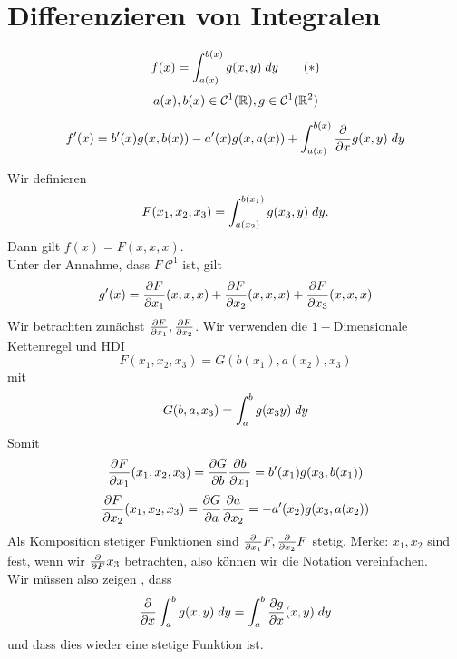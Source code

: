 \documentclass[../ana2u.tex]{subfiles}
\begin{document}
\setcounter{section}{11}
\section{Differenzieren von Integralen}
\[ f(x) = \integralx{g(x,y)}{a(x)}{b(x)}{y} \tag{\(*\)} \]
\[ a(x), b(x) \in \mathcal{C}^1(\R), 
g \in \mathcal{C}^1(\R^2) \]

\begin{beh}
    \[ f'(x) = b'(x)g(x, b(x)) - a'(x)g(x,a(x))
    + \integralx{\ddxpartial{x} g(x,y)}{a(x)}{b(x)}{y} \]
\end{beh}
\begin{bew}
    Wir definieren 
    \[ F(x_1, x_2, x_3) 
    = \integralx{g(x_3, y)}{a(x_2)}{b(x_1)}{y}. \]
    Dann gilt \( f(x) = F(x,x,x) \).\\
    Unter der Annahme, dass \( F \ \mathcal{C}^1 \) ist, 
    gilt
    \[ g'(x) = \ddxpartialboth{F}{x_1}(x,x,x) 
    + \ddxpartialboth{F}{x_2}(x,x,x) 
    + \ddxpartialboth{F}{x_3}(x,x,x) \]
    Wir betrachten zunächst \(\ddxpartialboth{F}{x_1}, 
    \ddxpartialboth{F}{x_2}\).
    Wir verwenden die \(1-\)Dimensionale Kettenregel und HDI
    \[ F(x_1, x_2, x_3) = G(b(x_1), a(x_2),x_3) \]
    mit 
    \[ G(b,a,x_3) = \integralx{g(x_3y)}{a}{b}{y} \]
    Somit
    \[ \ddxpartialboth{F}{x_1}(x_1,x_2,x_3) 
    = \ddxpartialboth{G}{b} \ddxpartialboth{b}{x_1} = b'(x_1)g(x_3, b(x_1)) \]
    \[ \ddxpartialboth{F}{x_2}(x_1,x_2,x_3) = \ddxpartialboth{G}{a} \ddxpartialboth{a}{x_2} = -a'(x_2)g(x_3,a(x_2)) \]
    Als Komposition stetiger Funktionen sind \(\ddxpartial{x_1}F, \ddxpartial{x_2}F\)
    stetig.
    Merke: \( x_1, x_2 \) sind fest, wenn wir 
    \( \ddxpartial{F}{x_3} \) betrachten, also 
    können wir die Notation vereinfachen.\\
    Wir müssen also zeigen , dass
    \[ \ddxpartial{x} \integralx{g(x,y)}{a}{b}{y} 
    = \integralx{\ddxpartialboth{g}{x} (x,y)}{a}{b}{y} \]
    und dass dies wieder eine stetige Funktion ist.
\end{bew}
\end{document}
